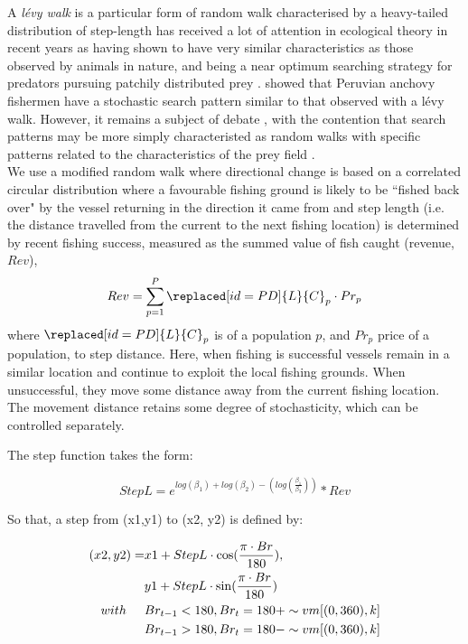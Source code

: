 \documentclass[review]{elsarticle}
\begin{document}
A \textit{ {lévy walk}} is a particular form of
random walk characterised by a heavy-tailed distribution of step-length
 has received a lot of attention in
ecological theory in recent years as having shown to have very similar
characteristics as those observed by animals in nature, and being a near
optimum searching strategy for predators pursuing patchily distributed prey
\citep{Viswanathan1999, Bartumeus2005, Sims2008}.  \citet{Bertrand2007} showed
that Peruvian anchovy fishermen have a stochastic search pattern similar to
that observed with a lévy walk. However, it remains a subject of debate
, with the
contention that search patterns may be more simply characteristed as random
walks \citep{Sakiyama2013} with specific patterns related to the
characteristics of the prey field \citep{Sims2012}. \\

We use a modified random walk where directional change is based on a correlated
circular distribution where a favourable fishing ground is likely to be
``fished back over" by the vessel returning in the direction it came from and
step length (i.e. the distance travelled from the current to the next fishing
location) is determined by  recent fishing success,
measured as the summed value of fish caught (revenue, $Rev$), $$Rev =
\sum_{p=1}^{P} \replaced[id=PD]{L}{C}_{p} \cdot Pr_{p}$$ where
$\replaced[id=PD]{L}{C}_{p}$ is  of a
population $p$, and $Pr_{p}$ price of a population, to step distance. Here,
when fishing is successful vessels remain in a similar location and continue to
exploit the local fishing grounds.  When unsuccessful, they move some distance
away from the current fishing location.  The movement distance retains some
degree of stochasticity, which can be controlled separately. 

The step function takes the form:

\begin{equation*}
	StepL = e^{log(\beta_{1}) + log(\beta_{2}) -
		(log(\frac{\beta_{1}}{\beta_{3}}))} * Rev
\end{equation*}

So that, a step from (x1,y1) to (x2, y2) is defined by:

\begin{equation*}
	\begin{split}
 (x2, y2) =  & x1 + StepL \cdot \cos (\frac{\pi \cdot Br}{180}), \\
             & y1 + StepL \cdot \sin (\frac{\pi \cdot Br}{180}) \\	
 with  \hspace{0.5cm}     & Br_{t-1} < 180, Br_{t} = 180 + \sim vm[(0,360), k] \\
 			  & Br_{t-1} > 180, Br_{t} = 180 - \sim vm[(0,360), k] \\
	\end{split}
\end{equation*}
\end{document}
